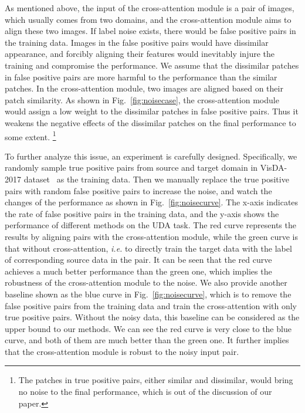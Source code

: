 \documentclass[dvipsnames, svgnames, x11names, table]{article} \usepackage{iclr2022_conference,times}
\begin{document}
\begin{spacing}{1.0}
As mentioned above, the input of the cross-attention module is a pair of images, which usually comes from two domains, and the cross-attention module aims to align these two images.
If label noise exists, there would be false positive pairs in the training data. Images in the false positive pairs would have dissimilar appearance, and forcibly aligning their features would inevitably injure the training and compromise the performance.
We assume that the dissimilar patches in false positive pairs are more harmful to the performance than the similar patches.
In the cross-attention module, two images are aligned based on their patch similarity. As shown in Fig.~\ref{fig:noisecase}, the cross-attention module would assign a low weight to the dissimilar patches in false positive pairs. Thus it weakens the negative effects of the dissimilar patches on the final performance to some extent.
\footnote{The patches in true positive pairs, either similar and dissimilar, would bring no noise to the final performance, which is out of the discussion of our paper.}

To further analyze this issue, an experiment is carefully designed. Specifically, we randomly sample true positive pairs from source and target domain in VisDA-2017 dataset~\citep{visda2017} as the training data. Then we manually replace the true positive pairs with random false positive pairs to increase the noise, and watch the changes of the performance as shown in Fig.~\ref{fig:noisecurve}. The x-axis indicates the rate of false positive pairs in the training data, and the y-axis shows the performance of different methods on the UDA task. The red curve represents the results by aligning pairs with the cross-attention module, while the green curve is that without cross-attention, \textit{i.e.} to directly train the target data with the label of corresponding source data in the pair. It can be seen that the red curve achieves a much better performance than the green one, which implies the robustness of the cross-attention module to the noise. We also provide another baseline shown as the blue curve in Fig.~\ref{fig:noisecurve}, which is to remove the false positive pairs from the training data and train the cross-attention with only true positive pairs. Without the noisy data, this baseline can be considered as the upper bound to our methods.
We can see the red curve is very close to the blue curve, and both of them are much better than the green one. It further implies that the cross-attention module is robust to the noisy input pair.






\end{spacing}
\end{document}

